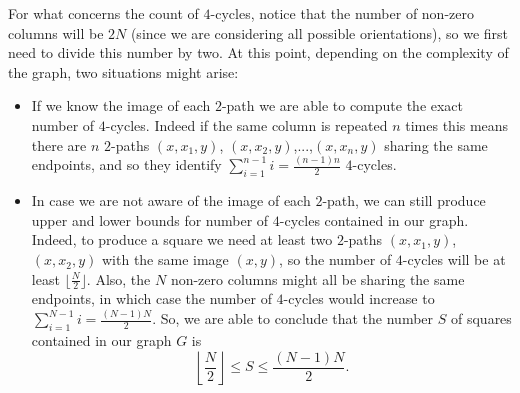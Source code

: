 \documentclass[runningheads]{llncs}
\begin{document}
For what concerns the count of $4$-cycles, notice that the number of non-zero columns will be $2N$ (since we are considering all possible orientations), so we first need to divide this number by two.
At this point, depending on the complexity of the graph, two situations might arise:
\begin{itemize}
    \item If we know the image of each $2$-path we are able to compute the exact number of $4$-cycles. Indeed if the same column is repeated $n$ times this means there are $n$ $2$-paths $(x,x_1,y)$, $(x,x_2,y)$,...,$(x,x_n,y)$ sharing the same endpoints, and so they identify $\sum_{i=1}^{n-1} i=\frac{(n-1)n}{2}$ $4$-cycles.
    \item In case we are not aware of the image of each $2$-path, we can still produce upper and lower bounds for number of $4$-cycles contained in our graph.
    Indeed, to produce a square we need at least two $2$-paths $(x,x_1,y)$, $(x,x_2,y)$ with the same image $(x,y)$, so the number of $4$-cycles will be at least $\lfloor \frac{N}{2} \rfloor$.
    Also, the $N$ non-zero columns might all be sharing the same endpoints, in which case the number of $4$-cycles would increase to $\sum_{i=1}^{N-1} i=\frac{(N-1)N}{2}$.
    So, we are able to conclude that the number $S$ of squares contained in our graph $G$ is
    \[
    \left\lfloor \frac{N}{2} \right\rfloor \leq S \leq \frac{(N-1)N}{2}.
    \]
\end{itemize}
  
\end{document}
